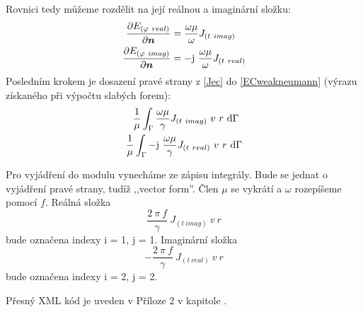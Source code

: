 \documentclass[12pt,a4paper,oneside]{article}
\numberwithin{equation}{section} %
\numberwithin{figure}{section} %
\numberwithin{table}{section} %
\newcommand{\mj}{\mathrm{j}} %
\renewcommand{\vec}[1]{\mbox{\boldmath$#1$}} %
\begin{document}
Rovnici tedy můžeme rozdělit na její reálnou a imaginární složku:
\begin{subequations}
\label{Jec}
\begin{align}
\frac{\partial E _{(\varphi ~real)}}{\partial \vec{n}} &= \frac{\omega \mu}{\omega}  J _{(t~imag)}
\\
\frac{\partial E _{(\varphi ~imag)}}{\partial \vec{n}} &= - \mj ~ \frac{\omega \mu}{\omega} J _{(t~real)}
\end{align}
\end{subequations}
Posledním krokem je dosazení pravé strany z \ref{Jec} do \ref{ECweakneumann} (výrazu získaného při výpočtu slabých forem):
\begin{subequations}
\begin{align}
\frac{1}{\mu} \int _{\Gamma} \frac{\omega \mu}{\gamma} J _{(t~imag)} ~ v ~ r ~ \ud \Gamma ~
\\
\frac{1}{\mu} \int _{\Gamma} - \mj ~ \frac{\omega \mu}{\gamma} J _{(t~real)} ~ v ~ r ~ \ud \Gamma
\end{align}
\end{subequations}

Pro vyjádření do modulu vynecháme ze zápisu integrály. Bude se jednat o vyjádření pravé strany, tudíž ,,vector form''. Člen $\mu$ se vykrátí a $\omega$ rozepíšeme pomocí $f$. Reálná složka  
\begin{equation}
\frac{2 ~ \pi ~ f}{\gamma} ~ J_{(t~imag)} ~ v ~ r
\end{equation} 
bude označena indexy i = 1, j = 1. Imaginární složka 
\begin{equation}
- \frac{2 ~ \pi ~ f}{\gamma} ~ J_{(t~real)} ~ v ~ r
\end{equation}
bude označena indexy i = 2, j = 2.

Přesný XML kód je uveden v Příloze 2 v kapitole .
\end{document}
